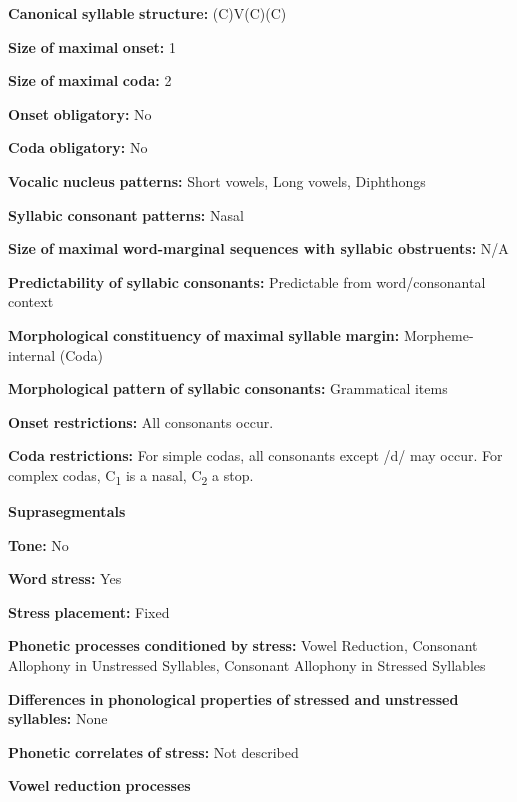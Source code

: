 \textbf{Canonical} \textbf{syllable} \textbf{structure:} (C)V(C)(C) \citep[6-9]{Sapir1965}

\textbf{Size} \textbf{of} \textbf{maximal} \textbf{onset:} 1

\textbf{Size} \textbf{of} \textbf{maximal} \textbf{coda:} 2

\textbf{Onset} \textbf{obligatory:} No

\textbf{Coda} \textbf{obligatory:} No

\textbf{Vocalic} \textbf{nucleus} \textbf{patterns:} Short vowels, Long vowels, Diphthongs

\textbf{Syllabic} \textbf{consonant} \textbf{patterns:} Nasal

\textbf{Size} \textbf{of} \textbf{maximal} \textbf{word{}-marginal sequences with syllabic obstruents:} N/A

\textbf{Predictability} \textbf{of} \textbf{syllabic} \textbf{consonants:} Predictable from word/consonantal context

\textbf{Morphological} \textbf{constituency} \textbf{of} \textbf{maximal} \textbf{syllable} \textbf{margin:} Morpheme-internal (Coda)

\textbf{Morphological} \textbf{pattern} \textbf{of} \textbf{syllabic} \textbf{consonants:} Grammatical items

\textbf{Onset} \textbf{restrictions:} All consonants occur.

\textbf{Coda} \textbf{restrictions:} For simple codas, all consonants except /d/ may occur. For complex codas, C\textsubscript{1} is a nasal, C\textsubscript{2} a stop.

\textbf{Suprasegmentals}

\textbf{Tone:} No

\textbf{Word} \textbf{stress:} Yes

\textbf{Stress} \textbf{placement:} Fixed

\textbf{Phonetic} \textbf{processes} \textbf{conditioned} \textbf{by} \textbf{stress:} Vowel Reduction, Consonant Allophony in Unstressed Syllables, Consonant Allophony in Stressed Syllables

\textbf{Differences} \textbf{in} \textbf{phonological} \textbf{properties} \textbf{of} \textbf{stressed} \textbf{and} \textbf{unstressed} \textbf{syllables:} None

\textbf{Phonetic} \textbf{correlates} \textbf{of} \textbf{stress:} Not described

\textbf{Vowel} \textbf{reduction} \textbf{processes}

